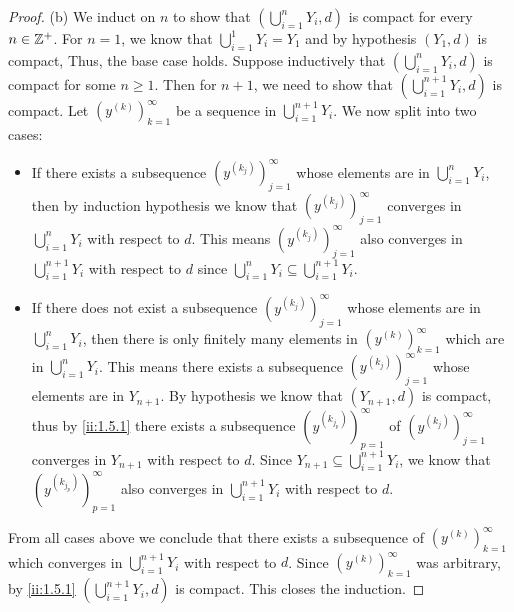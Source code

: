 \begin{proof}{(b)}
  We induct on \(n\) to show that \((\bigcup_{i = 1}^n Y_i, d)\) is compact for every \(n \in \mathbb{Z}^+\).
  For \(n = 1\), we know that \(\bigcup_{i = 1}^1 Y_i = Y_1\) and by hypothesis \((Y_1, d)\) is compact, Thus, the base case holds.
  Suppose inductively that \((\bigcup_{i = 1}^n Y_i, d)\) is compact for some \(n \geq 1\).
  Then for \(n + 1\), we need to show that \((\bigcup_{i = 1}^{n + 1} Y_i, d)\) is compact.
  Let \((y^{(k)})_{k = 1}^\infty\) be a sequence in \(\bigcup_{i = 1}^{n + 1} Y_i\).
  We now split into two cases:
  \begin{itemize}
    \item If there exists a subsequence \((y^{(k_j)})_{j = 1}^\infty\) whose elements are in \(\bigcup_{i = 1}^n Y_i\), then by induction hypothesis we know that \((y^{(k_j)})_{j = 1}^\infty\) converges in \(\bigcup_{i = 1}^n Y_i\) with respect to \(d\).
          This means \((y^{(k_j)})_{j = 1}^\infty\) also converges in \(\bigcup_{i = 1}^{n + 1} Y_i\) with respect to \(d\) since \(\bigcup_{i = 1}^n Y_i \subseteq \bigcup_{i = 1}^{n + 1} Y_i\).
    \item If there does not exist a subsequence \((y^{(k_j)})_{j = 1}^\infty\) whose elements are in \(\bigcup_{i = 1}^n Y_i\), then there is only finitely many elements in \((y^{(k)})_{k = 1}^\infty\) which are in \(\bigcup_{i = 1}^n Y_i\).
          This means there exists a subsequence \((y^{(k_j)})_{j = 1}^\infty\) whose elements are in \(Y_{n + 1}\).
          By hypothesis we know that \((Y_{n + 1}, d)\) is compact, thus by \cref{ii:1.5.1} there exists a subsequence \((y^{(k_{j_p})})_{p = 1}^\infty\) of \((y^{(k_j)})_{j = 1}^\infty\) converges in \(Y_{n + 1}\) with respect to \(d\).
          Since \(Y_{n + 1} \subseteq \bigcup_{i = 1}^{n + 1} Y_i\), we know that \((y^{(k_{j_p})})_{p = 1}^\infty\) also converges in \(\bigcup_{i = 1}^{n + 1} Y_i\) with respect to \(d\).
  \end{itemize}
  From all cases above we conclude that there exists a subsequence of \((y^{(k)})_{k = 1}^\infty\) which converges in \(\bigcup_{i = 1}^{n + 1} Y_i\) with respect to \(d\).
  Since \((y^{(k)})_{k = 1}^\infty\) was arbitrary, by \cref{ii:1.5.1} \((\bigcup_{i = 1}^{n + 1} Y_i, d)\) is compact.
  This closes the induction.
\end{proof}

